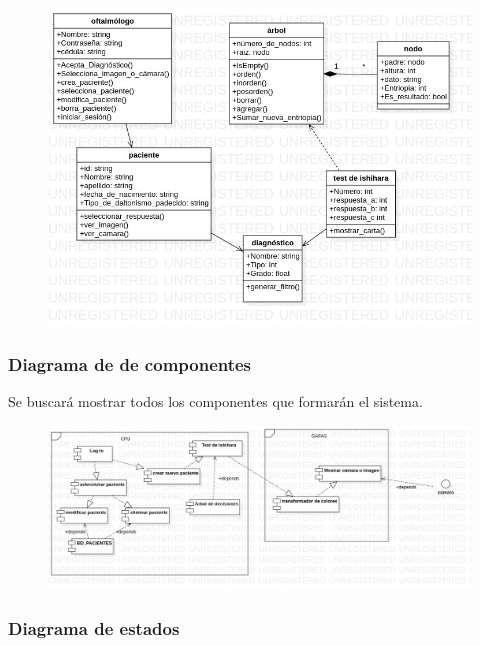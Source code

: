 \documentclass[10pt]{article}
\begin{document}
\begin{figure}[H]
	\begin{center}
\includegraphics[scale = 0.65]{UML/Model2!ClassDiagram1_2.jpg}
	\end{center} 
\end{figure}


\newpage
\subsubsection{Diagrama de de componentes}

Se buscará mostrar todos los componentes que formarán el sistema.

\begin{figure}[H]
	\begin{center}
\includegraphics[scale = 0.40]{UML/Model3!ComponentDiagram1_14.jpg}
	\end{center} 
\end{figure}

\subsubsection{Diagrama de estados}
\end{document}
